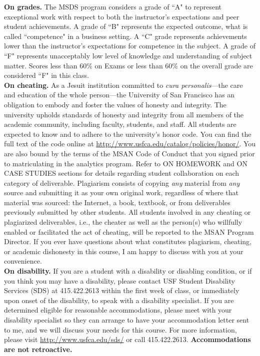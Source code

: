 \documentclass[11pt]{article}
\begin{document}
\noindent \textbf{On grades.} The MSDS program considers a grade of ``A" to represent exceptional work with respect to both the instructor's expectations and peer student achievements. A grade of ``B" represents the expected outcome, what is called ``competence" in a business setting. A ``C" grade represents achievements lower than the instructor's expectations for competence in the subject. A grade of ``F" represents unacceptably low level of knowledge and understanding of subject matter.  Scores less than 60\% on Exams or less than 60\% on the overall grade are considered ``F" in this class. \\

\noindent \textbf{On cheating.} As a Jesuit institution committed to \emph{cura personalis}---the care and education of the whole person---the University of San Francisco has an obligation to embody and foster the values of honesty and integrity. The university upholds standards of honesty and integrity from all members of the academic community, including faculty, students, and staff. All students are expected to know and to adhere to the university's honor code. You can find the full text of the code online at \url{http://www.usfca.edu/catalog/policies/honor/}. You are also bound by the terms of the MSAN Code of Conduct that you signed prior to matriculating in the analytics program. Refer to ON HOMEWORK and ON CASE STUDIES sections for details regarding student collaboration on each category of deliverable. Plagiarism consists of copying \emph{any} material from \emph{any} source and submitting it as your own original work, regardless of where that material was sourced: the Internet, a book, textbook, or from deliverables previously submitted by other students. All students involved in any cheating or plagiarized deliverables, i.e., the cheater as well as the person(s) who willfully enabled or facilitated the act of cheating, will be reported to the MSAN Program Director. If you ever have questions about what constitutes plagiarism, cheating, or academic dishonesty in this course, I am happy to discuss with you at your convenience.\\

\noindent \textbf{On disability.} If you are a student with a disability or disabling condition, or if you think you may have a disability, please contact USF Student Disability Services (SDS) at 415.422.2613 within the first week of class, or immediately upon onset of the disability, to speak with a disability specialist. If you are determined eligible for reasonable accommodations, please meet with your disability specialist so they can arrange to have your accommodation letter sent to me, and we will discuss your needs for this course. For more information, please visit \url{http://www.usfca.edu/sds/} or call 415.422.2613. {\bf Accommodations are not retroactive.}\\
\end{document}

